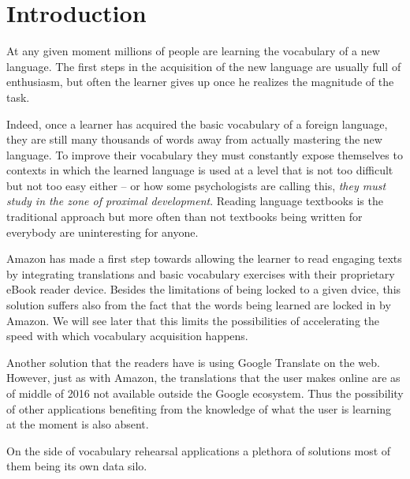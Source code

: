 \section{Introduction}

At any given moment millions of people are learning the vocabulary of a new language. The first steps in the acquisition of the new language are usually full of enthusiasm, but often the learner gives up once he realizes the magnitude of the task.

Indeed, once a learner has acquired the basic vocabulary of a foreign language, they are still many thousands of words away from actually mastering the new language. To improve their vocabulary they must constantly expose themselves to contexts in which the learned language is used at a level that is not too difficult but not too easy either -- or how some psychologists are calling this, {\em they must study in the zone of proximal development}. Reading language textbooks is the traditional approach but more often than not textbooks being written for everybody are uninteresting for anyone.

Amazon has made a first step towards allowing the learner to read engaging texts by integrating translations and basic vocabulary exercises with their proprietary eBook reader device. Besides the limitations of being locked to a given dvice, this solution suffers also from the fact that the words being learned are locked in by Amazon. We will see later that this limits the possibilities of accelerating the speed with which vocabulary acquisition happens.

Another solution that the readers have is using Google Translate on the web. However, just as with Amazon, the translations that the user makes online are as of middle of 2016 not available outside the Google ecosystem. Thus the possibility of other applications benefiting from the knowledge of what the user is learning at the moment is also absent.

On the side of vocabulary rehearsal applications a plethora of solutions most of them being its own data silo. 

